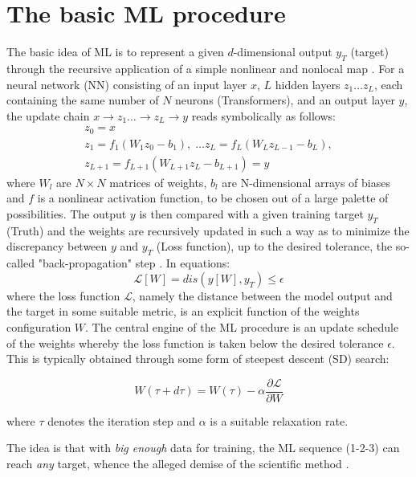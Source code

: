 \documentclass[15pt]{article}
\begin{document}
\section{The basic ML procedure}

The basic idea of ML is to represent a given $d$-dimensional 
output $y_T$ (target) through the recursive application 
of a simple nonlinear and nonlocal map \cite{ML}.
For a neural network (NN) consisting of an input layer $x$,  $L$ hidden layers
$z_1 \dots z_L$, each containing the same number of $N$ neurons (Transformers), and 
an output layer $y$,
the update chain $x \to z_1 \dots \to z_L \to  y$
reads symbolically as follows:
\begin{eqnarray}
\label{ML}
z_0 = x\\
z_1 = f_1(W_1 z_0       -b_1),\; \dots  z_L = f_L(W_L z_{L-1} -b_L),\\
z_{L+1} = f_{L+1}(W_{L+1} z_L -b_{L+1})=y
\end{eqnarray}
where $W_l$ are $N \times N$ matrices of weights, $b_l$ are N-dimensional arrays
of biases and $f$ is a nonlinear activation function, to be chosen out 
of a large palette of possibilities.
The output $y$ is then compared with a given training 
target $y_T$ (Truth) and the weights are
recursively updated in such a way as to minimize 
the discrepancy between $y$ and $y_T$ (Loss function), up 
to the desired tolerance, the so-called "back-propagation" step \cite{BACK}.  
In equations:
\begin{equation}
\label{LOSS}
\mathcal{L}[W] = dis (y[W],y_T) \le \epsilon
\end{equation}
where the loss function $\mathcal{L}$, namely the distance between
the model output and the target in some suitable metric, is
an explicit function of the weights configuration $W$.
The central engine of the ML procedure is an update schedule
of the weights whereby the loss function is taken below 
the desired tolerance $\epsilon$. 
This is typically obtained through some form of 
steepest descent (SD) search:

\begin{equation}
\label{SD}
W(\tau+d \tau)=W(\tau)- \alpha \frac{\partial \mathcal{L}}{\partial W}
\end{equation}

where $\tau$ denotes the iteration step and 
$\alpha$ is a suitable relaxation rate.

The idea is that with {\it big enough} data for training, 
the ML sequence (1-2-3) can reach {\it any} target, whence 
the alleged demise of the scientific method \cite{WIRED,PEDRO}.
\end{document}
